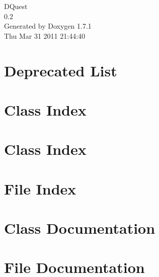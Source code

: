 \documentclass[a4paper]{book}
\begin{document}
\hypersetup{pageanchor=false}
\begin{titlepage}
\vspace*{7cm}
\begin{center}
{\Large DQuest \\[1ex]\large 0.2 }\\
\vspace*{1cm}
{\large Generated by Doxygen 1.7.1}\\
\vspace*{0.5cm}
{\small Thu Mar 31 2011 21:44:40}\\
\end{center}
\end{titlepage}
\clearemptydoublepage
{}
\tableofcontents
\clearemptydoublepage
{}
\hypersetup{pageanchor=true}
\chapter{Deprecated List}
\label{deprecated}
\hypertarget{deprecated}{}

\chapter{Class Index}

\chapter{Class Index}

\chapter{File Index}

\chapter{Class Documentation}



















\chapter{File Documentation}


\printindex
\end{document}
